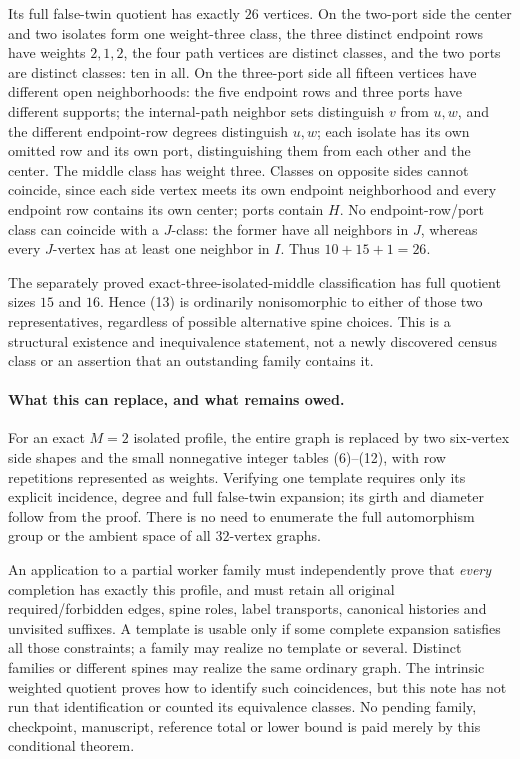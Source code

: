 \documentclass[11pt]{article}
\begin{document}
Its full false-twin quotient has exactly $26$ vertices. On the
two-port side the center and two isolates form one weight-three
class, the three distinct endpoint rows have weights $2,1,2$,
the four path vertices are distinct classes, and the two ports
are distinct classes: ten in all. On the three-port side all
fifteen vertices have different open neighborhoods: the five
endpoint rows and three ports have different supports; the
internal-path neighbor sets distinguish $v$ from $u,w$, and the
different endpoint-row degrees distinguish $u,w$; each isolate
has its own omitted row and its own port, distinguishing them
from each other and the center. The middle class has weight
three. Classes on opposite sides cannot coincide, since each
side vertex meets its own endpoint neighborhood and every
endpoint row contains its own center; ports contain $H$.
No endpoint-row/port class can coincide with a $J$-class: the
former have all neighbors in $J$, whereas every $J$-vertex has
at least one neighbor in $I$. Thus $10+15+1=26$.

The separately proved exact-three-isolated-middle classification
has full quotient sizes $15$ and $16$. Hence (13) is ordinarily
nonisomorphic to either of those two representatives, regardless
of possible alternative spine choices. This is a structural
existence and inequivalence statement, not a newly discovered
census class or an assertion that an outstanding family contains it.

\paragraph{What this can replace, and what remains owed.}
For an exact $M=2$ isolated profile, the entire graph is replaced by
two six-vertex side shapes and the small nonnegative integer tables
(6)--(12), with row repetitions represented as weights. Verifying one
template requires only its explicit incidence, degree and full
false-twin expansion; its girth and diameter follow from the proof.
There is no need to enumerate the full automorphism group or the
ambient space of all $32$-vertex graphs.

An application to a partial worker family must independently prove
that \emph{every} completion has exactly this profile, and must retain
all original required/forbidden edges, spine roles, label transports,
canonical histories and unvisited suffixes. A template is usable only
if some complete expansion satisfies all those constraints; a family
may realize no template or several. Distinct families or different
spines may realize the same ordinary graph. The intrinsic weighted
quotient proves how to identify such coincidences, but this note has
not run that identification or counted its equivalence classes.
No pending family, checkpoint, manuscript, reference total or lower
bound is paid merely by this conditional theorem.
\end{document}
